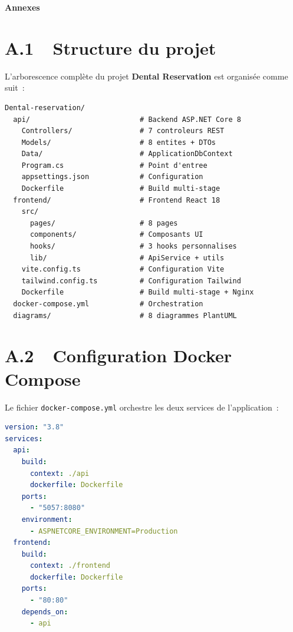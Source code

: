 \clearpage
\thispagestyle{plain}

\vspace*{2cm}

\begin{center}
{\fontsize{24}{29}\selectfont\bfseries Annexes}
\end{center}

\vspace{1.5cm}

\section*{A.1~~Structure du projet}

L'arborescence complète du projet \textbf{Dental Reservation} est organisée comme suit~:

\begin{lstlisting}[language={}, caption={Arborescence du projet}]
Dental-reservation/
  api/                          # Backend ASP.NET Core 8
    Controllers/                # 7 controleurs REST
    Models/                     # 8 entites + DTOs
    Data/                       # ApplicationDbContext
    Program.cs                  # Point d'entree
    appsettings.json            # Configuration
    Dockerfile                  # Build multi-stage
  frontend/                     # Frontend React 18
    src/
      pages/                    # 8 pages
      components/               # Composants UI
      hooks/                    # 3 hooks personnalises
      lib/                      # ApiService + utils
    vite.config.ts              # Configuration Vite
    tailwind.config.ts          # Configuration Tailwind
    Dockerfile                  # Build multi-stage + Nginx
  docker-compose.yml            # Orchestration
  diagrams/                     # 8 diagrammes PlantUML
\end{lstlisting}

\section*{A.2~~Configuration Docker Compose}

Le fichier \texttt{docker-compose.yml} orchestre les deux services de l'application~:

\begin{lstlisting}[language=yaml, caption={docker-compose.yml}]
version: "3.8"
services:
  api:
    build:
      context: ./api
      dockerfile: Dockerfile
    ports:
      - "5057:8080"
    environment:
      - ASPNETCORE_ENVIRONMENT=Production
  frontend:
    build:
      context: ./frontend
      dockerfile: Dockerfile
    ports:
      - "80:80"
    depends_on:
      - api
\end{lstlisting}

